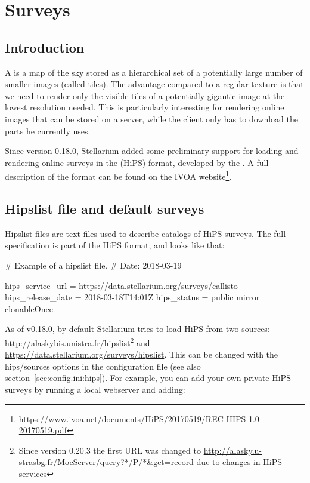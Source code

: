 
\chapter{Surveys}
\label{ch:surveys}

\section{Introduction}
\label{sec:surveys:introduction}


A   is a map of the sky stored as a hierarchical set of a potentially
large number of smaller images (called tiles).  The advantage compared to a
regular texture is that we need to render only the visible tiles of a potentially gigantic image at the
lowest resolution needed.  This is particularly interesting for rendering
online images that can be stored on a server, while the client only has
to download the parts he currently uses.

Since version 0.18.0, Stellarium added some preliminary support for loading and
rendering online surveys in the  (HiPS) format,
developed by the .
A full description of the format can be found on the IVOA website\footnote{%
\url{https://www.ivoa.net/documents/HiPS/20170519/REC-HIPS-1.0-20170519.pdf}}.

\section{Hipslist file and default surveys}
\label{sec:surveys:hipslistFile}

Hipslist files are text files used to describe catalogs of HiPS surveys.  The
full specification is part of the HiPS format, and looks like that:

\begin{configfileScr}
# Example of a hipslist file.
# Date: 2018-03-19

hips_service_url  = https://data.stellarium.org/surveys/callisto
hips_release_date = 2018-03-18T14:01Z
hips_status       = public mirror clonableOnce
\end{configfileScr}

As of v0.18.0, by default Stellarium tries to load HiPS from two sources:
\url{http://alaskybis.unistra.fr/hipslist}\footnote{Since version 0.20.3 the first URL 
was changed to \url{http://alasky.u-strasbg.fr/MocServer/query?*/P/*&get=record} due to changes in HiPS services} and
\url{https://data.stellarium.org/surveys/hipslist}.
This can be changed with the hips/sources options in the configuration
file (see also section~\ref{sec:config.ini:hips}).  For example, you can add your
own private HiPS surveys by running a local webserver and adding:

